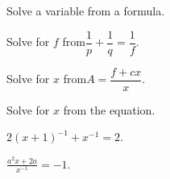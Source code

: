\newpage

\begin{exercise}
	Solve a variable from a formula.\\
	\begin{enumerate*}[label={(\arabic*)~}]
		\item Solve for $f$ from\quad $\dfrac1p+\dfrac1q=\dfrac1f$.
		\item Solve for $x$ from\quad $A=\dfrac{f+cx}{x}$.
		\hfill\null
	\end{enumerate*}
\end{exercise}

\vfill
\begin{center} \hfill
\end{center}


\begin{exercise}
	Solve for $x$ from the equation.\\
	\begin{enumerate*}[label={(\arabic*)~}]
		\item $2(x+1)^{-1}+x^{-1}=2$.
		\item $\displaystyle\frac{a^2x +2a}{x^{-1}}=-1$.
		\hfill\null
	\end{enumerate*}
\end{exercise}

\vfill
\begin{center} \hfill
\end{center}